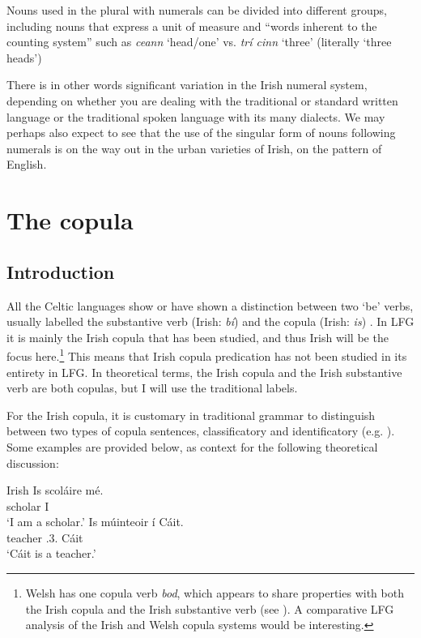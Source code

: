 \documentclass[output=paper,colorlinks,citecolor=brown]{langscibook}
\begin{document}
Nouns used in the plural with numerals can be divided into different groups, including nouns that express a unit of measure \citep[102--104]{OSiadhail1982} and ``words inherent to the counting system'' such as \emph{ceann} `head/one' vs. \emph{trí cinn} `three' (literally `three heads') \citep[167]{OSiadhail1989}

There is in other words significant variation in the Irish numeral system, depending on whether you are dealing with the traditional or standard written language or the traditional spoken language with its many dialects. We may perhaps also expect to see that the use of the singular form of nouns following numerals is on the way out in the urban varieties of Irish, on the pattern of English.

\section{The copula}
\label{sec:Celtic:5}

\subsection{Introduction}
\label{sec:Celtic:5.1}

All the Celtic languages show or have shown a distinction between two `be' verbs, usually labelled the substantive verb (Irish: \emph{bí}) and the copula (Irish: \emph{is}) \citep[19--20, etc.]{Fife2002}. In LFG it is mainly the Irish copula that has been studied, and thus Irish will be the focus here.\footnote{Welsh has one copula verb \emph{bod}, which appears to share properties with both the Irish copula and the Irish substantive verb (see \citealt{Borsley2019}). A comparative LFG analysis of the Irish and Welsh copula systems would be interesting.} This means that Irish copula predication has not been studied in its entirety in LFG. In theoretical terms, the Irish copula and the Irish substantive verb are both copulas, but I will use the traditional labels.

For the Irish copula, it is customary in traditional grammar to distinguish between two types of copula sentences, classificatory and identificatory (e.g. \citealt[224]{OSiadhail1989}). Some examples are provided below, as context for the following theoretical discussion:

\ea\label{ex:Celtic:40} Irish \citep[224]{OSiadhail1989}
\ea
\gll Is scoláire m\'e.\\
{\COP} scholar I\\
\glt`I am a scholar.'
\ex
\gll Is múinteoir í  Cáit.\\
{\COP} teacher \AGR.3\SG.{\F} Cáit\\
\glt`Cáit is a teacher.'
\z\z
\end{document}
